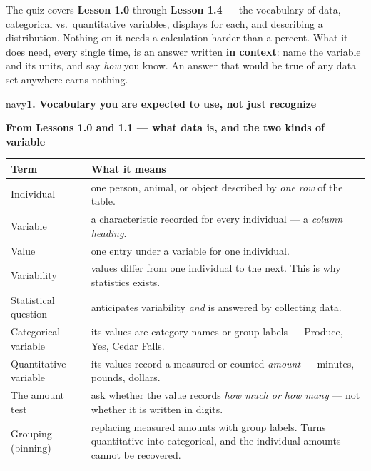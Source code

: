 \documentclass[12pt]{article}
\newcommand{\sghead}[1]{%
  \vspace{0.13in}
  \boxguard[10]
  \begin{headlinebox}{navy}\color{white}\bfseries\small #1\end{headlinebox}
  \vspace{0.09in}}
\begin{document}

\vspace{0.12in}

\boxguard[8]
\begin{remindbox}
\small
The quiz covers \textbf{Lesson 1.0} through \textbf{Lesson 1.4} --- the vocabulary of data,
categorical vs.\ quantitative variables, displays for each, and describing a distribution.
Nothing on it needs a calculation harder than a percent. What it does need, every single time,
is an answer written \textbf{in context}: name the variable and its units, and say \emph{how}
you know. An answer that would be true of any data set anywhere earns nothing.
\end{remindbox}

\sghead{1. Vocabulary you are expected to use, not just recognize}

\small
\renewcommand{\arraystretch}{1.26}

\textbf{From Lessons 1.0 and 1.1 --- what data is, and the two kinds of variable}
\par\vspace{3pt}
\noindent\begin{tabularx}{\linewidth}{@{} l X @{}}
\rowcolor{sky}
\textbf{Term} & \textbf{What it means} \\
\midrule
Individual & one person, animal, or object described by \emph{one row} of the table. \\
Variable & a characteristic recorded for every individual --- a \emph{column heading}. \\
Value & one entry under a variable for one individual. \\
Variability & values differ from one individual to the next. This is why statistics exists. \\
Statistical question & anticipates variability \emph{and} is answered by collecting data. \\
Categorical variable & its values are category names or group labels --- Produce, Yes, Cedar Falls. \\
Quantitative variable & its values record a measured or counted \emph{amount} --- minutes, pounds, dollars. \\
The amount test & ask whether the value records \emph{how much or how many} --- not whether it
                   is written in digits. \\
Grouping (binning) & replacing measured amounts with group labels. Turns quantitative into
                   categorical, and the individual amounts cannot be recovered. \\
\end{tabularx}
\end{document}
